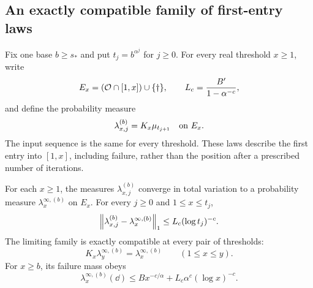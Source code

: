 \subsection{An exactly compatible family of first-entry laws}

Fix one base $b\geq s_*$ and put $t_j=b^{\alpha^j}$ for $j\geq0$.
For every real threshold $x\geq1$, write
\[
 E_x=(\mathcal O\cap[1,x])\cup\{\dagger\},\qquad
 L_c=\frac{B'}{1-\alpha^{-c}},
\]
and define the probability measure
\begin{equation}\label{eq:lattice-law}
 \lambda_{x,j}^{(b)}=K_x\mu_{t_{j+1}}\quad\hbox{on }E_x.
\end{equation}
The input sequence is the same for every threshold. These laws describe
the first entry into $[1,x]$, including failure, rather than the position
after a prescribed number of iterations.

\begin{corollary}\label{cor:limit}
For each $x\geq1$, the measures $\lambda_{x,j}^{(b)}$ converge in total
variation to a probability measure $\lambda_x^{\infty,(b)}$ on $E_x$.
For every $j\geq0$ and $1\leq x\leq t_j$,
\begin{equation}\label{eq:lattice-rate}
 \left\|\lambda_{x,j}^{(b)}-\lambda_x^{\infty,(b)}\right\|_1
 \leq L_c(\log t_j)^{-c}.
\end{equation}
The limiting family is exactly compatible at every pair of thresholds:
\begin{equation}\label{eq:lattice-compatible}
 K_x\lambda_y^{\infty,(b)}=\lambda_x^{\infty,(b)}
 \qquad(1\leq x\leq y).
\end{equation}
For $x\geq b$, its failure mass obeys
\begin{equation}\label{eq:all-threshold-failure}
 \lambda_x^{\infty,(b)}(\dd)
 \leq Bx^{-c/\alpha}+L_c\alpha^c(\log x)^{-c}.
\end{equation}
\end{corollary}

